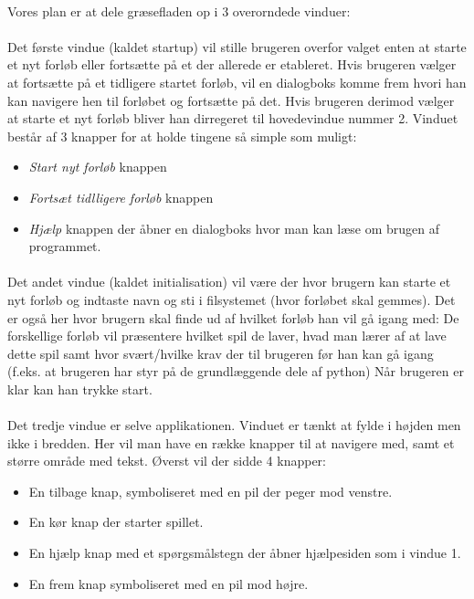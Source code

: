 \documentclass[10pt,a4paper,danish]{article}
\begin{document}
\paragraph{}
Vores plan er at dele græsefladen op i 3 overorndede vinduer:

\paragraph{}
Det første vindue (kaldet startup) vil stille brugeren overfor valget enten at starte et 
nyt forløb eller fortsætte på et der allerede er etableret.
Hvis brugeren vælger at fortsætte på et tidligere startet forløb, vil en dialogboks komme 
frem hvori han kan navigere hen til forløbet og fortsætte på det.
Hvis brugeren derimod vælger at starte et nyt forløb bliver han dirregeret til hovedevindue
nummer 2. Vinduet består af 3 knapper for at holde tingene så simple som muligt: 
\begin{itemize}
\item \textit{Start nyt forløb} knappen
\item \textit{Fortsæt tidlligere forløb} knappen
\item \textit{Hjælp} knappen der åbner en dialogboks hvor man kan læse om brugen af programmet.
\end{itemize}

\paragraph{}
Det andet vindue (kaldet initialisation) vil være der hvor brugern kan starte et nyt forløb og
indtaste navn og sti i filsystemet (hvor forløbet skal gemmes).
Det er også her hvor brugern skal finde ud af hvilket forløb han vil gå igang med: De forskellige
forløb vil præsentere hvilket spil de laver, hvad man lærer af at lave dette spil samt hvor svært/hvilke
 krav der til brugeren før han kan gå igang (f.eks. at brugeren har styr på de grundlæggende dele af python)
Når brugeren er klar kan han trykke start.

\paragraph{}
Det tredje vindue er selve applikationen.
Vinduet er tænkt at fylde i højden men ikke i bredden.
Her vil man have en række knapper til at navigere med, samt et større område med tekst.
Øverst vil der sidde 4 knapper: 
\begin{itemize}
  \item En tilbage knap, symboliseret med en pil der peger mod venstre.
  \item En kør knap der starter spillet.
  \item En hjælp knap med et spørgsmålstegn der åbner hjælpesiden som i vindue 1.
  \item En frem knap symboliseret med en pil mod højre.
\end{itemize}
\end{document}
